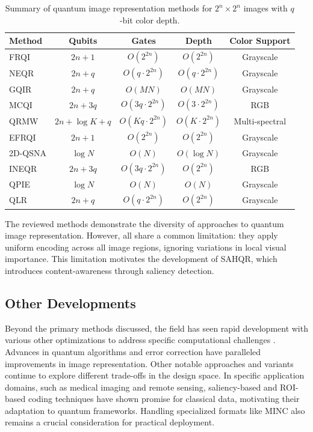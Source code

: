 \documentclass{ipol}
\begin{document}
\begin{table}[!htbp]
\caption{Summary of quantum image representation methods for $2^n \times 2^n$ images with $q$-bit color depth.}
\label{tab:related_summary}
\centering
\begin{tabular}{@{}lcccc@{}}
\toprule
Method & Qubits & Gates & Depth & Color Support \\
\midrule
FRQI & $2n+1$ & $O(2^{2n})$ & $O(2^{2n})$ & Grayscale \\
NEQR & $2n+q$ & $O(q \cdot 2^{2n})$ & $O(q \cdot 2^{2n})$ & Grayscale \\
GQIR & $2n+q$ & $O(MN)$ & $O(MN)$ & Grayscale \\
MCQI & $2n+3q$ & $O(3q \cdot 2^{2n})$ & $O(3 \cdot 2^{2n})$ & RGB \\
QRMW & $2n+\log K+q$ & $O(Kq \cdot 2^{2n})$ & $O(K \cdot 2^{2n})$ & Multi-spectral \\
EFRQI & $2n+1$ & $O(2^{2n})$ & $O(2^{2n})$ & Grayscale \\
2D-QSNA & $\log N$ & $O(N)$ & $O(\log N)$ & Grayscale \\
INEQR & $2n+3q$ & $O(3q \cdot 2^{2n})$ & $O(2^{2n})$ & RGB \\
QPIE & $\log N$ & $O(N)$ & $O(N)$ & Grayscale \\
QLR & $2n+q$ & $O(q \cdot 2^{2n})$ & $O(2^{2n})$ & Grayscale \\
\bottomrule
\end{tabular}
\end{table}

The reviewed methods demonstrate the diversity of approaches to quantum image representation. However, all share a common limitation: they apply uniform encoding across all image regions, ignoring variations in local visual importance. This limitation motivates the development of SAHQR, which introduces content-awareness through saliency detection.

\subsection{Other Developments}

Beyond the primary methods discussed, the field has seen rapid development with various other optimizations to address specific computational challenges \cite{bib45}. Advances in quantum algorithms \cite{bib5,bib6,bib7,bib8} and error correction have paralleled improvements in image representation. Other notable approaches and variants \cite{bib20,bib21,bib22,bib23,bib17,bib24,bib25} continue to explore different trade-offs in the design space. In specific application domains, such as medical imaging and remote sensing, saliency-based and ROI-based coding techniques \cite{bib32,bib33,bib34,bib35,bib41,bib59} have shown promise for classical data, motivating their adaptation to quantum frameworks. Handling specialized formats like MINC \cite{bib60,bib61} also remains a crucial consideration for practical deployment.
\end{document}

